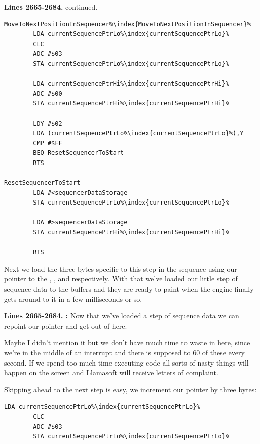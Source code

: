 \clearpage
\textbf{Lines 2665-2684. } continued.
\begin{lstlisting}[escapechar=\%]
MoveToNextPositionInSequencer%\index{MoveToNextPositionInSequencer}%   
        LDA currentSequencePtrLo%\index{currentSequencePtrLo}%
        CLC 
        ADC #$03
        STA currentSequencePtrLo%\index{currentSequencePtrLo}%

        LDA currentSequencePtrHi%\index{currentSequencePtrHi}%
        ADC #$00
        STA currentSequencePtrHi%\index{currentSequencePtrHi}%

        LDY #$02
        LDA (currentSequencePtrLo%\index{currentSequencePtrLo}%),Y
        CMP #$FF
        BEQ ResetSequencerToStart
        RTS 

ResetSequencerToStart   
        LDA #<sequencerDataStorage
        STA currentSequencePtrLo%\index{currentSequencePtrLo}%

        LDA #>sequencerDataStorage
        STA currentSequencePtrHi%\index{currentSequencePtrHi}%

        RTS 
\end{lstlisting}

\clearpage

Next we load the three bytes specific to this step in the sequence using our pointer  to the , , and
 respectively. With that we've loaded our little step of sequence data to the buffers and they are ready to paint when the engine finally gets around to it
in a few milliseconds or so.


\textbf{Lines 2665-2684. :}  Now that we've loaded a step of sequence data we can repoint our pointer and get out of here. 

Maybe I didn't
mention it but we don't have much time to waste in here, since we're in the middle of an interrupt and there is supposed to 60 of these every second. If we spend too much time executing
code all sorts of nasty things will happen on the screen and Llamasoft will receive letters of complaint. 

Skipping ahead to the next step is easy, we increment our pointer by three bytes:
\begin{lstlisting}[escapechar=\%]
        LDA currentSequencePtrLo%\index{currentSequencePtrLo}%
        CLC 
        ADC #$03
        STA currentSequencePtrLo%\index{currentSequencePtrLo}%
\end{lstlisting}

